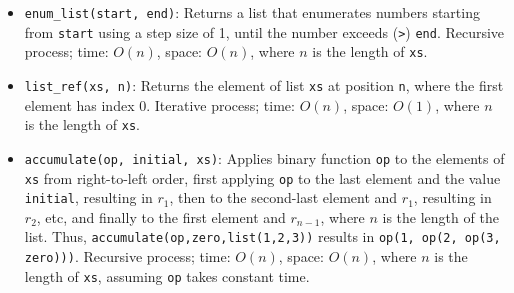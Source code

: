 \begin{itemize}
\item \lstinline{enum_list(start, end)}: Returns a list that enumerates
numbers starting from \lstinline{start} using a step size of 1, until
the number exceeds (\lstinline{>}) \lstinline{end}.
Recursive process;
time: $O(n)$, space: $O(n)$, where $n$ is the length of \lstinline{xs}.
\item \lstinline{list_ref(xs, n)}: Returns the element
of list \lstinline{xs} at position \lstinline{n}, 
where the first element has index 0.
Iterative process;
time: $O(n)$, space: $O(1)$, where $n$ is the length of \lstinline{xs}.
\item \lstinline{accumulate(op, initial, xs)}: Applies binary
function \lstinline{op} to the elements of \lstinline{xs} from
right-to-left order, first applying \lstinline{op} to the last element
and the value \lstinline{initial}, resulting in $r_1$, then to the 
second-last element and $r_1$, resulting in $r_2$, etc, and finally
to the first element and $r_{n-1}$, where $n$ is the length of the
list. Thus, \lstinline{accumulate(op,zero,list(1,2,3))} results in
\lstinline{op(1, op(2, op(3, zero)))}.
Recursive process;
time: $O(n)$, space: $O(n)$, where $n$ is the length of \lstinline{xs},
assuming \lstinline{op} takes constant time.
\end{itemize}
